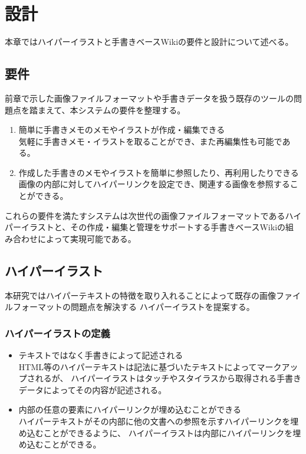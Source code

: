 \chapter{設計}
\label{chap:sekkei}

本章ではハイパーイラストと手書きベースWikiの要件と設計について述べる。

\newpage

\section{要件}
前章で示した画像ファイルフォーマットや手書きデータを扱う既存のツールの問題点を踏まえて、本システムの要件を整理する。
\begin{enumerate}
    \item 簡単に手書きメモのメモやイラストが作成・編集できる\\
    気軽に手書きメモ・イラストを取ることができ、また再編集性も可能である。
    \item 作成した手書きのメモやイラストを簡単に参照したり、再利用したりできる\\
    画像の内部に対してハイパーリンクを設定でき、関連する画像を参照することができる。
\end{enumerate}
これらの要件を満たすシステムは次世代の画像ファイルフォーマットであるハイパーイラストと、その作成・編集と管理をサポートする手書きベースWikiの組み合わせによって実現可能である。

\section{ハイパーイラスト}
本研究ではハイパーテキストの特徴を取り入れることによって既存の画像ファイルフォーマットの問題点を解決する
ハイパーイラストを提案する。

\subsection{ハイパーイラストの定義}
\begin{itemize}
    \item テキストではなく手書きによって記述される \\
    HTML等のハイパーテキストは記法に基づいたテキストによってマークアップされるが、
    ハイパーイラストはタッチやスタイラスから取得される手書きデータによってその内容が記述される。
    \item 内部の任意の要素にハイパーリンクが埋め込むことができる \\
    ハイパーテキストがその内部に他の文書への参照を示すハイパーリンクを埋め込むことができるように、
    ハイパーイラストは内部にハイパーリンクを埋め込むことができる。
\end{itemize}

